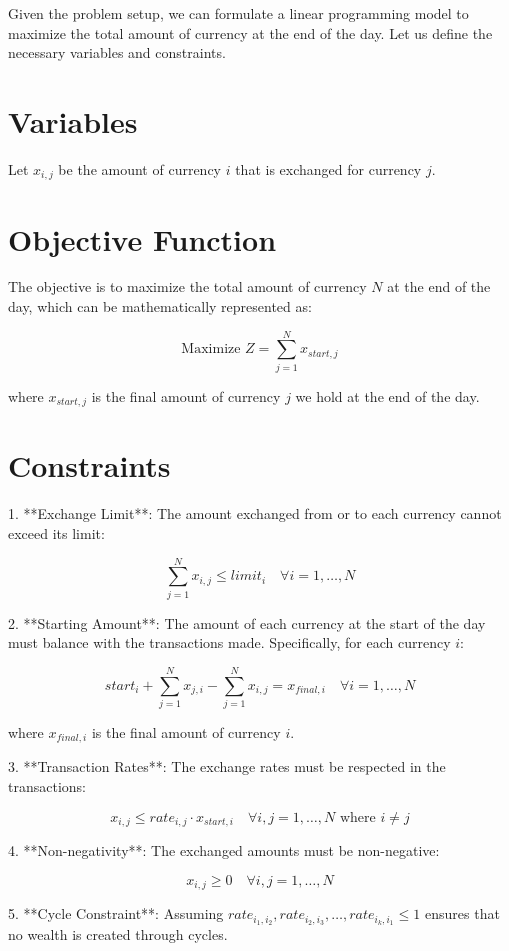 \documentclass{article}
\begin{document}
Given the problem setup, we can formulate a linear programming model to maximize the total amount of currency at the end of the day. Let us define the necessary variables and constraints.

\section*{Variables}
Let \( x_{i,j} \) be the amount of currency \( i \) that is exchanged for currency \( j \).

\section*{Objective Function}
The objective is to maximize the total amount of currency \( N \) at the end of the day, which can be mathematically represented as:

\[
\text{Maximize } Z = \sum_{j=1}^{N} x_{start,j}
\]

where \( x_{start,j} \) is the final amount of currency \( j \) we hold at the end of the day.

\section*{Constraints}
1. **Exchange Limit**: The amount exchanged from or to each currency cannot exceed its limit:

\[
\sum_{j=1}^{N} x_{i,j} \leq limit_i \quad \forall i = 1, \ldots, N
\]

2. **Starting Amount**: The amount of each currency at the start of the day must balance with the transactions made. Specifically, for each currency \( i \):

\[
start_i + \sum_{j=1}^{N} x_{j,i} - \sum_{j=1}^{N} x_{i,j} = x_{final,i} \quad \forall i = 1, \ldots, N
\]

where \( x_{final,i} \) is the final amount of currency \( i \).

3. **Transaction Rates**: The exchange rates must be respected in the transactions:

\[
x_{i,j} \leq rate_{i,j} \cdot x_{start,i} \quad \forall i,j = 1, \ldots, N \text{ where } i \neq j
\]

4. **Non-negativity**: The exchanged amounts must be non-negative:

\[
x_{i,j} \geq 0 \quad \forall i,j = 1, \ldots, N
\]

5. **Cycle Constraint**: Assuming \( rate_{i_1,i_2}, rate_{i_2,i_3}, \ldots, rate_{i_k,i_1} \leq 1 \) ensures that no wealth is created through cycles.
\end{document}
